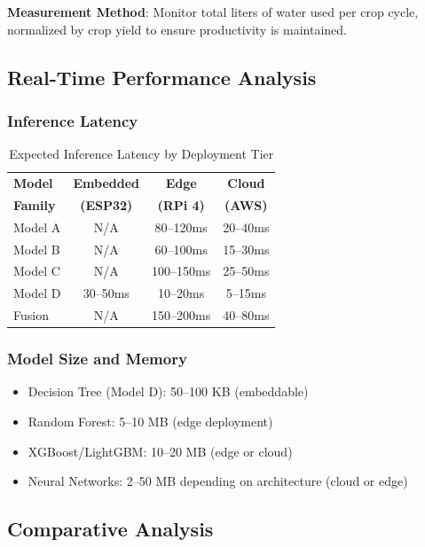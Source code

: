\documentclass[conference]{IEEEtran}
\begin{document}
\textbf{Measurement Method}: Monitor total liters of water used per crop cycle, normalized by crop yield to ensure productivity is maintained.

\subsection{Real-Time Performance Analysis}

\subsubsection{Inference Latency}

\begin{table}[htbp]
\caption{Expected Inference Latency by Deployment Tier}
\begin{center}
\begin{tabular}{|l|c|c|c|}
\hline
\textbf{Model} & \textbf{Embedded} & \textbf{Edge} & \textbf{Cloud} \\
\textbf{Family} & \textbf{(ESP32)} & \textbf{(RPi 4)} & \textbf{(AWS)} \\
\hline
Model A & N/A & 80--120ms & 20--40ms \\
Model B & N/A & 60--100ms & 15--30ms \\
Model C & N/A & 100--150ms & 25--50ms \\
Model D & 30--50ms & 10--20ms & 5--15ms \\
Fusion & N/A & 150--200ms & 40--80ms \\
\hline
\end{tabular}
\label{tab:latency}
\end{center}
\end{table}

\subsubsection{Model Size and Memory}

\begin{itemize}
\item Decision Tree (Model D): 50--100 KB (embeddable)
\item Random Forest: 5--10 MB (edge deployment)
\item XGBoost/LightGBM: 10--20 MB (edge or cloud)
\item Neural Networks: 2--50 MB depending on architecture (cloud or edge)
\end{itemize}

\subsection{Comparative Analysis}
\end{document}
